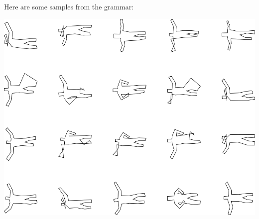 Here are some samples from the grammar:

\includegraphics[width=6in]{output/3.learning/incremental/gram.28.d/samples.png}

